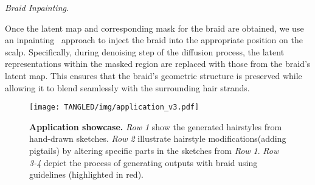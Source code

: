 \vspace{4pt}
\noindent \textit{Braid Inpainting.}

Once the latent map and corresponding mask for the braid are obtained, we use an inpainting~\cite{lugmayr2022repaint} approach to inject the braid into the appropriate position on the scalp. Specifically, during denoising step of the diffusion process, the latent representations within the masked region are replaced with those from the braid’s latent map. This ensures that the braid’s geometric structure is preserved while allowing it to blend seamlessly with the surrounding hair strands.


\begin{figure}[tbp]
  \texttt{[image: TANGLED/img/application\_v3.pdf]}
  \caption{\textbf{Application showcase.} \textit{Row 1} show the generated hairstyles from hand-drawn sketches. \textit{Row 2} illustrate hairstyle modifications(adding pigtails) by altering specific parts in the sketches from \textit{Row 1}. \textit{Row 3-4} depict the process of generating outputs with braid using guidelines (highlighted in red).}
  \label{fig:application}
\end{figure}
